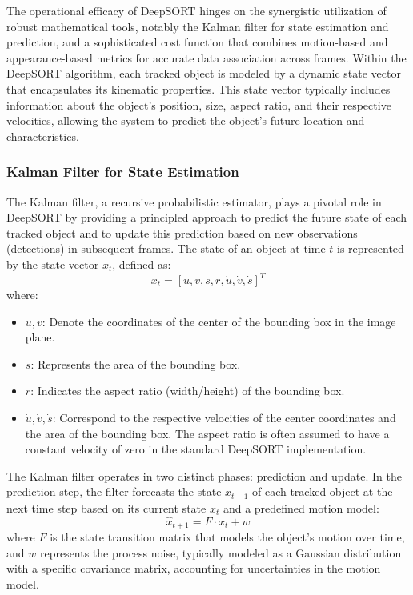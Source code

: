 The operational efficacy of DeepSORT hinges on the synergistic utilization of robust mathematical tools, notably the Kalman filter for state estimation and prediction, and a sophisticated cost function that combines motion-based and appearance-based metrics for accurate data association across frames. Within the DeepSORT algorithm, each tracked object is modeled by a dynamic state vector that encapsulates its kinematic properties. This state vector typically includes information about the object's position, size, aspect ratio, and their respective velocities, allowing the system to predict the object's future location and characteristics.

\subsubsection{Kalman Filter for State Estimation}

The Kalman filter, a recursive probabilistic estimator, plays a pivotal role in DeepSORT by providing a principled approach to predict the future state of each tracked object and to update this prediction based on new observations (detections) in subsequent frames. The state of an object at time $t$ is represented by the state vector $x_t$, defined as:
$$
x_t = [u, v, s, r, \dot{u}, \dot{v}, \dot{s}]^T
$$
where:
\begin{itemize}
    \item $u, v$: Denote the coordinates of the center of the bounding box in the image plane.
    \item $s$: Represents the area of the bounding box.
    \item $r$: Indicates the aspect ratio (width/height) of the bounding box.
    \item $\dot{u}, \dot{v}, \dot{s}$: Correspond to the respective velocities of the center coordinates and the area of the bounding box. The aspect ratio is often assumed to have a constant velocity of zero in the standard DeepSORT implementation.
\end{itemize}

The Kalman filter operates in two distinct phases: prediction and update. In the prediction step, the filter forecasts the state $x_{t+1}$ of each tracked object at the next time step based on its current state $x_t$ and a predefined motion model:
$$
\hat{x}_{t+1} = F \cdot x_t + w
$$
where $F$ is the state transition matrix that models the object's motion over time, and $w$ represents the process noise, typically modeled as a Gaussian distribution with a specific covariance matrix, accounting for uncertainties in the motion model.

